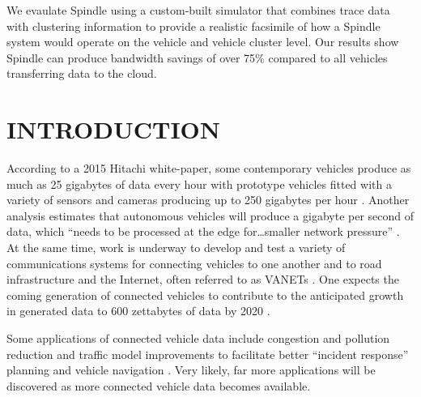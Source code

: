 \documentclass{thesis}
\begin{document}
    We evaulate Spindle using a custom-built simulator that combines trace data
    with clustering information to provide a realistic facsimile of how a Spindle system
    would operate on the vehicle and vehicle cluster level. Our results show Spindle can
    produce bandwidth savings of over 75\% compared to all vehicles transferring data to the cloud.

\chapter{INTRODUCTION}
    According to a 2015 Hitachi white-paper, some contemporary vehicles produce as much
    as 25 gigabytes of data every hour with prototype vehicles fitted with a variety of sensors
    and cameras producing up to 250 gigabytes per hour \cite{hitachi}. Another analysis estimates
    that autonomous vehicles will produce a gigabyte per second of data, which ``needs to be
    processed at the edge for\dots smaller network pressure'' \cite{edgecomputing}.
    At the same time, work is underway
    to develop and test a variety of communications systems for connecting vehicles to one another
    and to road infrastructure and the Internet, often referred to as VANETs \cite{connectivitypaper}.  
    One expects the coming generation
    of connected vehicles to contribute to the anticipated growth in generated data to 600 zettabytes
    of data by 2020 \cite{cisco:cloudindex}.

    Some applications of connected vehicle data include congestion and pollution reduction \cite{cv:trafficmonitoring}
    and traffic model improvements to facilitate better ``incident response'' planning and
    vehicle navigation \cite{hive}. Very likely, far more applications will be discovered
    as more connected vehicle data becomes available. 
\end{document}
